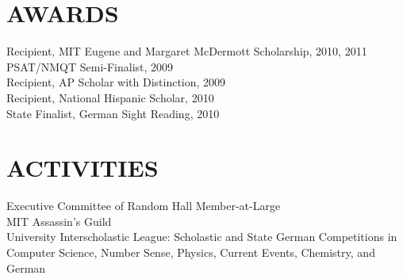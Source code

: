 \documentclass[margin]{res}
\begin{document}
\begin{resume}
 
\section{AWARDS} Recipient, MIT Eugene and Margaret McDermott Scholarship, 2010, 2011\\ 
        PSAT/NMQT Semi-Finalist, 2009 \\
        Recipient, AP Scholar with Distinction, 2009 \\ 
        Recipient, National Hispanic Scholar, 2010 \\
        State Finalist, German Sight Reading, 2010 \\

\section{ACTIVITIES}             
        Executive Committee of Random Hall Member-at-Large \\
        MIT Assassin's Guild \\
        University Interscholastic League: Scholastic and State German Competitions in
        Computer Science, Number Sense, Physics, Current Events, Chemistry, and German
 

\end{resume}
\end{document}
